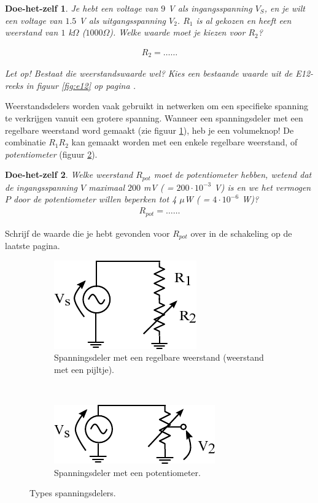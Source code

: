 \documentclass{article}
\newtheorem{DIY}{Doe-het-zelf}
\begin{document}
			\begin{DIY}
				Je hebt een voltage van $9$ V als ingangsspanning $V_S$, en je wilt een voltage van $1.5$ V als uitgangsspanning $V_2$. $R_1$ is al gekozen en heeft een weerstand van $1$ k$\Omega$ ($1000 \Omega$). Welke waarde moet je kiezen voor $R_2$?
				
				\begin{align*}
				    R_2 = \ldots\ldots
				\end{align*}

				Let op! Bestaat die weerstandswaarde wel? Kies een bestaande waarde uit de E12-reeks in figuur \ref{fig:e12} op pagina \pageref{fig:e12}.
			\end{DIY}

			Weerstandsdelers worden vaak gebruikt in netwerken om een specifieke spanning te verkrijgen vanuit een grotere spanning.
			Wanneer een spanningsdeler met een regelbare weerstand word gemaakt (zie figuur \ref{subfig:regelbareR}), heb je een volumeknop! De combinatie $R_1R_2$ kan gemaakt worden met een enkele regelbare weerstand, of \emph{potentiometer} (figuur \ref{subfig:pot}).

			\begin{DIY} Welke weerstand $R_{pot}$ moet de potentiometer hebben, wetend dat de ingangsspanning $V$ maximaal $200$ mV ( = $200 \cdot 10^{-3}$ V) is en we het vermogen $P$ door de potentiometer willen beperken tot 4 $\mu$W ( = $4 \cdot 10^{-6}$ W)? 
			\begin{align*}
			    R_{pot} = \ldots\ldots
			\end{align*}
			\end{DIY}			

			Schrijf de waarde die je hebt gevonden voor $R_{pot}$ over in de schakeling op de laatste pagina.
			\begin{figure}
				\centering
				\begin{subfigure}[b]{0.45\linewidth}
					\centering
					\includegraphics{regelbareR}
					\caption{Spanningsdeler met een regelbare weerstand (weerstand met een pijltje).}
					\label{subfig:regelbareR}
				\end{subfigure}
				~
				\begin{subfigure}[b]{0.45\linewidth}
					\centering
					\includegraphics{potentiometer.pdf}
					\caption{Spanningsdeler met een potentiometer.}
					\label{subfig:pot}
				\end{subfigure}
			\caption{Types spanningsdelers.}
			\label{fig:vdeler} 
			\end{figure}
\end{document}
